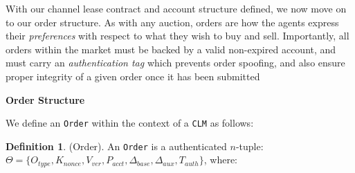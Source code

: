 \documentclass[12pt,a4paper]{article}
\theoremstyle{definition}
\newtheorem{definition}{Definition}[section]
\begin{document}
With our channel lease contract and account structure defined, we now move on
to our order structure. As with any auction, orders are how the agents express
their \emph{preferences} with respect to what they wish to buy and sell.
Importantly, all orders within the market must be backed by a valid non-expired
account, and must carry an \emph{authentication tag} which prevents order
spoofing, and also ensure proper integrity of a given order once it has been
submitted

\begin{center}
\textbf{Order Structure}
\end{center}

We define an \texttt{Order} within the context of a \texttt{CLM} as follows:

\theoremstyle{definition}
\begin{definition}{(Order).}
    An \texttt{Order} is a authenticated $n$-tuple: \\ $\Theta = \{O_{type}, K_{nonce},
    V_{ver}, P_{acct}, \Delta_{base}, \Delta_{aux}, T_{auth} \} $, where:

\end{definition}
\end{document}
